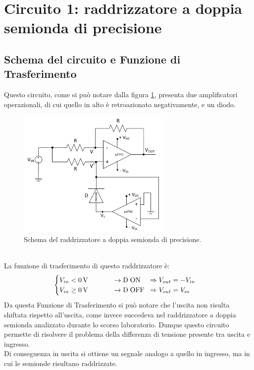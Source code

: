\documentclass{report}
\begin{document}
\newpage
\section{Circuito 1: raddrizzatore a doppia semionda di precisione}
\subsection{Schema del circuito e Funzione di Trasferimento}
Questo circuito, come si può notare dalla figura \ref{figura:schema1}, presenta due amplificatori operazionali, di cui quello in alto è retroazionato negativamente, e un diodo.
\begin{figure}[h]
	\centering
	\includegraphics[height=6.2cm]{immagini/schema1}
	\caption{Schema del raddrizzatore a doppia semionda di precisione.}
	\label{figura:schema1}
\end{figure}
\\ \noindent La funzione di trasferimento di questo raddrizzatore è:
\begin{equation}
   \begin{cases}
   V_{in}< \SI{0}{\volt}\;\;\indent\indent\rightarrow \mathrm{D\;ON}\;\;\;\; \Rightarrow V_{out} = -V_{in}\\
   V_{in}\ge \SI{0}{\volt}\;\;\indent\indent\rightarrow \mathrm{D\; OFF}\;\; \Rightarrow V_{out} = V_{in}
   \end{cases}
\end{equation}
Da questa Funzione di Trasferimento si può notare che l'uscita non risulta shiftata rispetto all'uscita, come invece succedeva nel raddrizzatore a doppia semionda analizzato durante lo scorso laboratorio. Dunque questo circuito permette di risolvere il problema della differenza di tensione presente tra uscita e ingresso.
\\Di conseguenza in uscita si ottiene un segnale analogo a quello in ingresso, ma in cui le semionde risultano raddrizzate.
\end{document}
